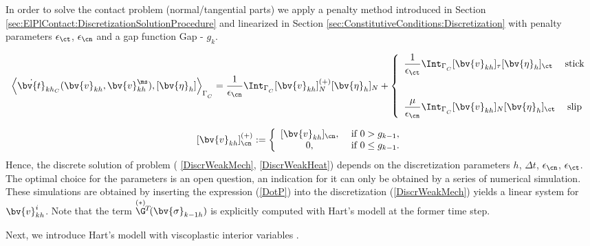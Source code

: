In order to solve the contact problem  (normal/tangential parts) we apply a penalty method introduced in Section \ref{sec:ElPlContact:DiscretizationSolutionProcedure} and linearized in Section \ref{sec:ConstitutiveConditions:Discretization} with penalty  parameters  $\epsilon_{\ct}$, $\epsilon_{\cn}$ and a gap function Gap - $g_k$.

\begin{equation}\label{DotP}
\left\langle\dot{\bv{t}}_{kh_{C}} (\bv{v}_{kh}^{\sl},\bv{v}_{kh}^{\ms}), [\bv{\eta}_h]\right\rangle_{\Gamma^{\sl}_{C}}=\frac{1}{\epsilon_{\cn}}\Int_{\Gamma^{\sl}_{C}} [\bv{v}_{kh}]^{(+)}_N[\bv{\eta}_h]_N+
\left\{
\begin{array}{lc}
\displaystyle\frac{1}{\epsilon_{\ct}}\Int_{\Gamma^{\sl}_{C}} [\bv{v}_{kh}]_{\tau} [\bv{\eta}_h]_{\ct}& \mbox{stick}\\[7ex]
\displaystyle\frac{\mu}{\epsilon_{\cn}}\Int_{\Gamma^{\sl}_{C}} [\bv{v}_{kh}]_{N} [\bv{\eta}_h]_{\ct}& \mbox{slip}
\end{array}
\right.
\end{equation}

\begin{equation}\nonumber
[\bv{v}_{kh}]^{(+)}_{\cn}:=
\left\{
\begin{array}{cc}
[\bv{v}_{kh}]_{\cn}, & \mbox{ if }0>g_{k-1}, \\
0, &\mbox{ if } 0\leq g_{k-1}. \\
\end{array}
\right.
\end{equation}
Hence, the discrete solution of problem  ( \ref{DiscrWeakMech}, \ref{DiscrWeakHeat}) depends on the discretization parameters $h$, $\Delta t$, $\epsilon_{\cn}$, $\epsilon_{\ct}$. The optimal choice for the parameters is an open question, an indication for it can only be obtained by a series of numerical simulation. These simulations are obtained by inserting the expression  (\ref{DotP}) into the discretization  (\ref{DiscrWeakMech}) yields a linear system for $\bv{v}^{i}_{kh}$. Note that the term $\stackrel{(*)}{\G}\!\!{}^T\!(\bv{\sigma}_{{k-1}h})$ is explicitly computed with Hart's modell at the former time step. 

Next, we introduce Hart's modell with viscoplastic interior variables \cite{DonigaDipl05}. 



